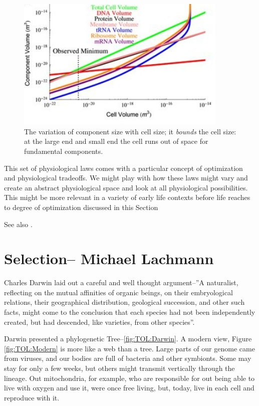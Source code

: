 \documentclass[]{article}
\begin{document}
\begin{figure}[H]
	\caption[The variation of component size with cell size]{The variation of component size with cell size; it \textit{bounds} the cell size: at the large end and small end the cell runs out of space for fundamental components.\cite{kempes2016evolutionary}}\label{fig:BacterialPhysiology}
	\includegraphics[width=0.9\textwidth]{BacterialPhysiology}
\end{figure}

This set of physiological laws comes with a particular concept of optimization and physiological tradeoffs. We might play with how these laws might vary and create an abstract physiological space and look at all physiological possibilities. This might be more relevant in a variety of early life contexts before life reaches to degree of optimization discussed in this Section


See also \cite{kempes2011predicting}.

\section{Selection-- Michael Lachmann}

Charles Darwin laid out a careful and well thought argument--''A naturalist, reflecting on the mutual affinities of organic beings, on their embryological relations, their geographical distribution, geological succession, and other such facts, might come to the conclusion that each species had not been independently created, but had descended, like varieties, from other  species''\cite{darwin1859origin}.

Darwin presented a phylogenetic Tree--\ref{fig:TOL:Darwin}. A modern view, Figure \ref{fig:TOL:Modern} is more like a web than a tree. Large parts of our genome came from viruses, and our bodies are full of bacteria and other symbionts. Some may stay for only a few weeks, but others might transmit vertically through the lineage. Out mitochondria, for example, who are responsible for out being able to live with oxygen and use it, were once free living, but, today, live in each cell and reproduce with it.
\end{document}
